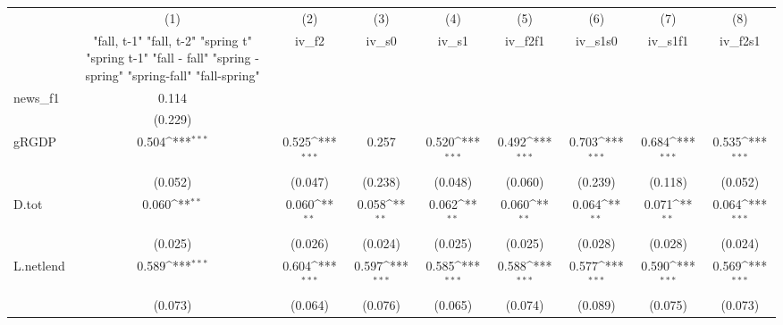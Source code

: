 {
\def\sym#1{\ifmmode^{#1}\else\(^{#1}\)\fi}
\begin{tabular}{l*{8}{c}}
\toprule
            &\multicolumn{1}{c}{(1)}&\multicolumn{1}{c}{(2)}&\multicolumn{1}{c}{(3)}&\multicolumn{1}{c}{(4)}&\multicolumn{1}{c}{(5)}&\multicolumn{1}{c}{(6)}&\multicolumn{1}{c}{(7)}&\multicolumn{1}{c}{(8)}\\
            &\multicolumn{1}{c}{  "fall, t-1" "fall, t-2" "spring t" "spring t-1"  "fall - fall" "spring - spring" "spring-fall" "fall-spring" }&\multicolumn{1}{c}{iv\_f2}&\multicolumn{1}{c}{iv\_s0}&\multicolumn{1}{c}{iv\_s1}&\multicolumn{1}{c}{iv\_f2f1}&\multicolumn{1}{c}{iv\_s1s0}&\multicolumn{1}{c}{iv\_s1f1}&\multicolumn{1}{c}{iv\_f2s1}\\
\midrule
news\_f1     &       0.114         &                     &                     &                     &                     &                     &                     &                     \\
            &     (0.229)         &                     &                     &                     &                     &                     &                     &                     \\
\addlinespace
gRGDP       &       0.504\sym{***}&       0.525\sym{***}&       0.257         &       0.520\sym{***}&       0.492\sym{***}&       0.703\sym{***}&       0.684\sym{***}&       0.535\sym{***}\\
            &     (0.052)         &     (0.047)         &     (0.238)         &     (0.048)         &     (0.060)         &     (0.239)         &     (0.118)         &     (0.052)         \\
\addlinespace
D.tot       &       0.060\sym{**} &       0.060\sym{**} &       0.058\sym{**} &       0.062\sym{**} &       0.060\sym{**} &       0.064\sym{**} &       0.071\sym{**} &       0.064\sym{***}\\
            &     (0.025)         &     (0.026)         &     (0.024)         &     (0.025)         &     (0.025)         &     (0.028)         &     (0.028)         &     (0.024)         \\
\addlinespace
L.netlend   &       0.589\sym{***}&       0.604\sym{***}&       0.597\sym{***}&       0.585\sym{***}&       0.588\sym{***}&       0.577\sym{***}&       0.590\sym{***}&       0.569\sym{***}\\
            &     (0.073)         &     (0.064)         &     (0.076)         &     (0.065)         &     (0.074)         &     (0.089)         &     (0.075)         &     (0.073)         \\

\end{tabular}}
